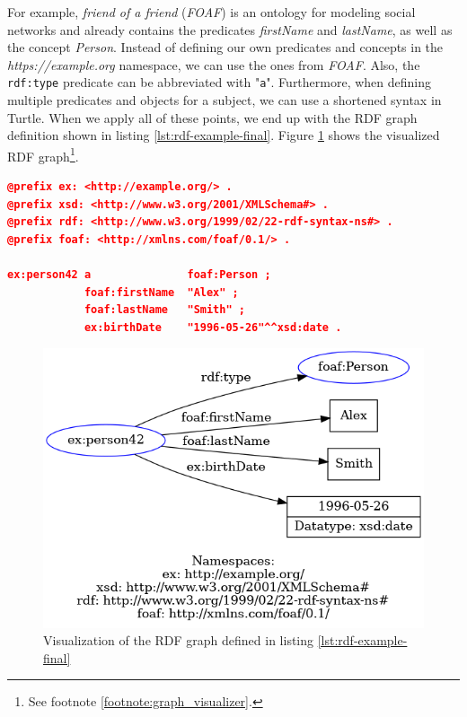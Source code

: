 For example, \textit{friend of a friend} (\textit{FOAF})\cite{brickley2007foaf} is an ontology for modeling social networks and already contains the predicates \textit{firstName} and \textit{lastName}, as well as the concept \textit{Person}.
Instead of defining our own predicates and concepts in the \textit{https://example.org} namespace, we can use the ones from \textit{FOAF}.
Also, the \texttt{rdf:type} predicate can be abbreviated with "\texttt{a}".
Furthermore, when defining multiple predicates and objects for a subject, we can use a shortened syntax in Turtle.
When we apply all of these points, we end up with the RDF graph definition shown in listing \ref{lst:rdf-example-final}. 
Figure \ref{fig:rdf_graph_final} shows the visualized RDF graph\footnote{See footnote \ref{footnote:graph_visualizer}.}.

\begin{lstlisting}[language=json,basicstyle=\scriptsize,firstnumber=1,caption={Complete RDF example},captionpos=b,label={lst:rdf-example-final}]
@prefix ex: <http://example.org/> .
@prefix xsd: <http://www.w3.org/2001/XMLSchema#> .
@prefix rdf: <http://www.w3.org/1999/02/22-rdf-syntax-ns#> .
@prefix foaf: <http://xmlns.com/foaf/0.1/> .

ex:person42 a               foaf:Person ;
            foaf:firstName  "Alex" ;
            foaf:lastName   "Smith" ;
            ex:birthDate    "1996-05-26"^^xsd:date .
\end{lstlisting}


\begin{figure}[!t]
    \centering
    \includegraphics[width=\columnwidth]{figures/rdf_graph_example_final}
    \caption{Visualization of the RDF graph defined in listing \ref{lst:rdf-example-final}}
    \label{fig:rdf_graph_final}
\end{figure}



